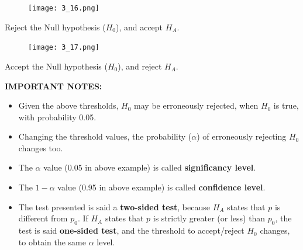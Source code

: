 \begin{frame}
  \begin{figure}
    \centering
    \texttt{[image: 3\_16.png]}
  \end{figure}
  Reject the Null hypothesis ($H_0$), and accept $H_A$.
\end{frame}


\begin{frame}
  \begin{figure}
    \centering
    \texttt{[image: 3\_17.png]}
  \end{figure}
  Accept the Null hypothesis ($H_0$), and reject $H_A$.
\end{frame}

\begin{frame}
  \textbf{IMPORTANT NOTES:} 
  \begin{itemize}
    \item Given the above thresholds, $H_0$ may be erroneously rejected, when $H_0$ is true, with probability 0.05.
    \vspace{0.15cm}
    \item Changing the threshold values, the probability ($\alpha$) of erroneously rejecting $H_0$ changes too.
    \vspace{0.15cm}
    \item The $\alpha$ value (0.05 in above example) is called \textbf{significancy level}.
    \vspace{0.15cm}
    \item The $1-\alpha$ value (0.95 in above example) is called \textbf{confidence level}.
    \vspace{0.15cm}
    \item The test presented is said a \textbf{two-sided test}, because $H_A$ states that $p$ is different from $p_0$. If $H_A$ states that $p$ is strictly greater (or less) than $p_0$, the test is said \textbf{one-sided test}, and the threshold to accept/reject $H_0$ changes, to obtain the same $\alpha$ level.
  \end{itemize}
\end{frame}

